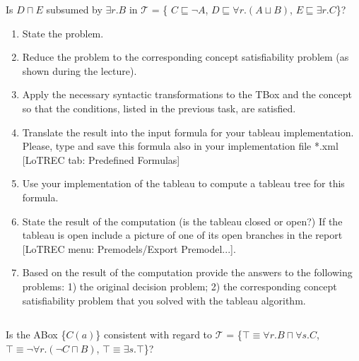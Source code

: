 \documentclass[11pt]{article} %
\begin{document}
\begin{center}
Is $D \sqcap E$ subsumed by $\exists r.B$ in $\mathcal{T}$ = \{ $C \sqsubseteq \neg A$, $D \sqsubseteq \forall r.(A \sqcup B)$, $E \sqsubseteq \exists r.C$\}?
\end{center}

\begin{enumerate}
\item State the problem.
\item Reduce the problem to the corresponding concept satisfiability problem (as shown during the lecture).
\item Apply the necessary syntactic transformations to the TBox and the concept so that the conditions, listed in the previous task, are satisfied.
\item Translate the result into the input formula for your tableau implementation. Please, type and save this formula also in your implementation file *.xml [LoTREC tab: Predefined Formulas]
\item Use your implementation of the tableau to compute a tableau tree for this formula.
\item State the result of the computation (is the tableau closed or open?) If the tableau is open include a picture of one of its open branches in the report [LoTREC menu: Premodels/Export Premodel...].
\item Based on the result of the computation provide the answers to the following problems: 1) the original decision problem; 2) the corresponding concept satisfiability problem that you solved with the tableau algorithm.
\end{enumerate}

\subsection{}

\begin{center}
Is the ABox \{$C(a)$\} consistent with regard to $\mathcal{T}$ = \{$\top \equiv \forall r.B \sqcap \forall s.C$, $\top \equiv \neg \forall r.(\neg C \sqcap B)$, $\top \equiv \exists s.\top$\}?
\end{center}
\end{document}
